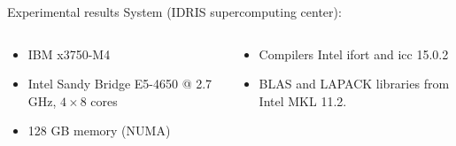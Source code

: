 \begin{frame}{Experimental results}
  System  (IDRIS supercomputing center):
  \begin{columns}
    \begin{column}{0.5\textwidth}
        \begin{itemize}
        \item IBM x3750-M4
        \item Intel Sandy Bridge E5-4650 @ 2.7
          GHz, $4\times 8$ cores
        \item 128 GB memory (NUMA)
        \end{itemize}

    \end{column}
    \begin{column}{0.5\textwidth}
        
        \begin{itemize}
        \item Compilers Intel ifort and icc 15.0.2
        \item BLAS and LAPACK libraries from Intel MKL 11.2.
        \end{itemize}
    \end{column}
  \end{columns}


\end{frame}
